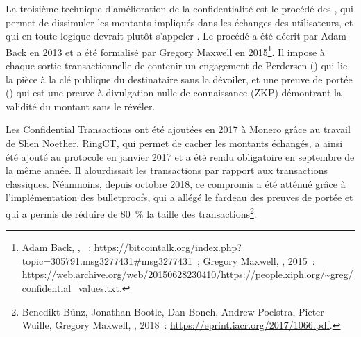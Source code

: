 

La troisième technique d'amélioration de la confidentialité est le procédé des , qui permet de dissimuler les montants impliqués dans les échanges des utilisateurs, et qui en toute logique devrait plutôt s'appeler . Le procédé a été décrit par Adam Back en 2013 et a été formalisé par Gregory Maxwell en 2015\footnote{Adam Back, , ~: \url{https://bitcointalk.org/index.php?topic=305791.msg3277431\#msg3277431}~; Gregory Maxwell, , 2015~: \url{https://web.archive.org/web/20150628230410/https://people.xiph.org/~greg/confidential_values.txt}.}. Il impose à chaque sortie transactionnelle de contenir un engagement de Perdersen () qui lie la pièce à la clé publique du destinataire sans la dévoiler, et une preuve de portée () qui est une preuve à divulgation nulle de connaissance (ZKP) démontrant la validité du montant sans le révéler.

Les Confidential Transactions ont été ajoutées en 2017 à Monero grâce au travail de Shen Noether. RingCT, qui permet de cacher les montants échangés, a ainsi été ajouté au protocole en janvier 2017 et a été rendu obligatoire en septembre de la même année. Il alourdissait les transactions par rapport aux transactions classiques. Néanmoins, depuis octobre 2018, ce compromis a été atténué grâce à l'implémentation des bulletproofs, qui a allégé le fardeau des preuves de portée et qui a permis de réduire de 80~\% la taille des transactions\footnote{Benedikt Bünz, Jonathan Bootle, Dan Boneh, Andrew Poelstra, Pieter Wuille, Gregory Maxwell, , 2018~: \url{https://eprint.iacr.org/2017/1066.pdf}.}.


